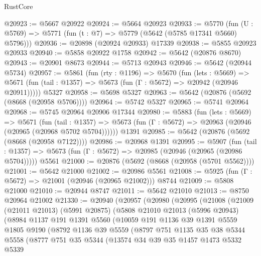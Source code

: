 \begin{lexlean}{RustCore}
\begin{coremodule}
@20923 := @5667 @20922
@20924 := @5664 @20923
@20933 := @5770
    (fun (U : @5769) => @5771 (fun (t : @7) => @5779 (@5642 (@5785 @17341 @5660) @5796)))
@20936 := @20898 (@20924 @20933) @17339
@20938 := @5855 @20923 @20933
@20940 := @5858 @20922 @1758
@20942 := @5642 (@20876 @8670)
@20943 := @20901 @8673
@20944 := @5713 @20943
@20946 := @5642 (@20944 @5734)
@20957 := @5861
    (fun (rty : @1196) =>
    @5670
      (fun (lets : @5669) =>
      @5671 (fun (tail : @1357) => @5673 (fun (Γ : @5672) => @20942 (@20946 @20911)))))
    @5327
@20958 := @5698 @5327
@20963 := @5642 (@20876 (@5692 (@8668 (@20958 @5706))))
@20964 := @5742 @5327
@20965 := @5741 @20964
@20968 := @5745 @20964 @20906 @17344
@20980 := @5883
    (fun (lets : @5669) =>
    @5671
      (fun (tail : @1357) =>
      @5673 (fun (Γ : @5672) => @20963 (@20946 (@20965 (@20968 @5702 @5704))))))
    @1391
@20985 := @5642 (@20876 (@5692 (@8668 (@20958 @7122))))
@20986 := @20968 @1391
@20995 := @5907
    (fun (tail : @1357) => @5673 (fun (Γ : @5672) => @20985 (@20946 (@20965 (@20986 @5704)))))
    @5561
@21000 := @20876 (@5692 (@8668 (@20958 (@5701 @5562))))
@21001 := @5642 @21000
@21002 := @20986 @5561
@21008 := @5925 (fun (Γ : @5672) => @21001 (@20946 (@20965 @21002))) @8744
@21009 := @5808 @21000
@21010 := @20944 @8747
@21011 := @5642 @21010
@21013 := @8750 @20964 @21002
@21330 := @20940
    (@20957
      (@20980
        (@20995
          (@21008
            (@21009
              (@21011 @21013)
              (@5991 @20875)
              (@5808
                @21010
                @21013
                (@5996 @20943)
                (@8984
                  @1137
                  @191
                  @1391
                  @5560
                  (@10059
                    @191
                    @1136
                    @39
                    @1391
                    @5559
                    @1805
                    @9190
                    (@8792
                      @1136
                      @39
                      @5559
                      (@8797
                        @751
                        @1135
                        @35
                        @38
                        @5344
                        @5558
                        (@8777
                          @751
                          @35
                          @5344
                          (@13574
                            @34
                            @39
                            @35
                            @1457
                            @1473
                            @5332
                            @5339

\end{coremodule}
\end{lexlean}
